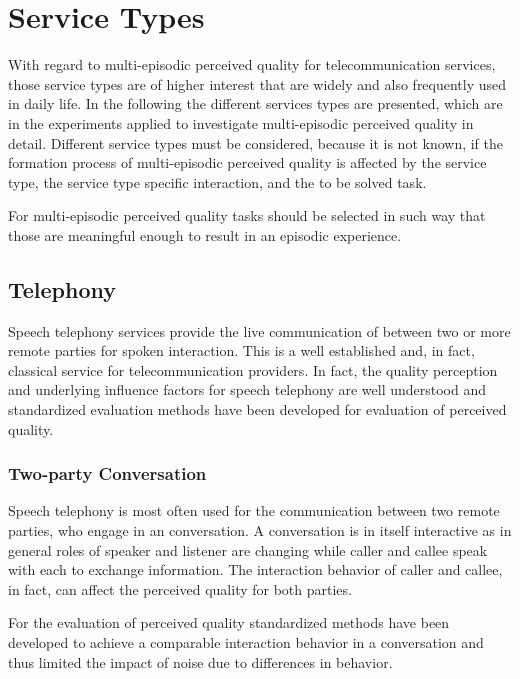 \section{Service Types}
With regard to multi-episodic perceived quality for telecommunication services, those service types are of higher interest that are widely and also frequently used in daily life.
In the following the different services types are presented, which are in the experiments applied to investigate multi-episodic perceived quality in detail.
Different service types must be considered, because it is not known, if the formation process of multi-episodic perceived quality is affected by the service type, the service type specific interaction, and the to be solved task.

For multi-episodic perceived quality tasks should be selected in such way that those are meaningful enough to result in an episodic experience.

\subsection{Telephony}
Speech telephony services provide the live communication of between two or more remote parties for spoken interaction.
This is a well established and, in fact, classical service for telecommunication providers.
In fact, the quality perception and underlying influence factors for speech telephony are well understood and standardized evaluation methods have been developed for evaluation of perceived quality.

\subsubsection{Two-party Conversation}
Speech telephony is most often used for the communication between two remote parties, who engage in an conversation.
A conversation is in itself interactive as in general roles of speaker and listener are changing while caller and callee speak with each to exchange information.
The interaction behavior of caller and callee, in fact, can affect the perceived quality for both parties.

For the evaluation of perceived quality standardized methods have been developed to achieve a comparable interaction behavior in a conversation and thus limited the impact of noise due to differences in behavior.


